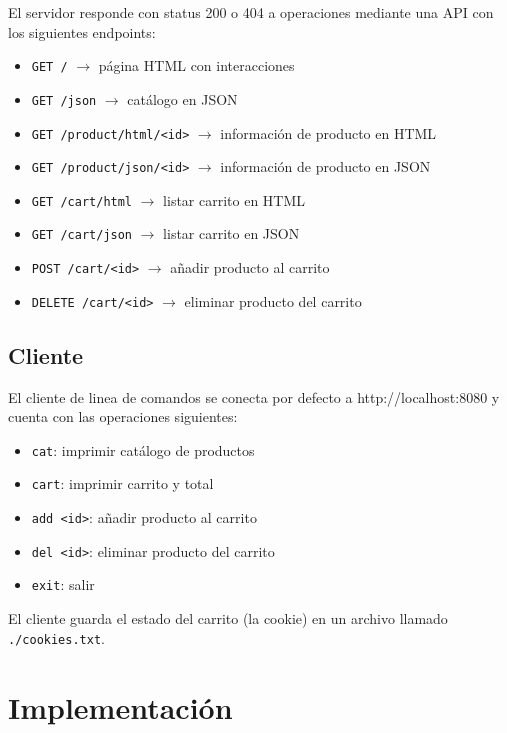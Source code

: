 \documentclass[12pt]{article}
\begin{document}
    El servidor responde con status 200 o 404 a operaciones mediante una API con los siguientes endpoints:
    \begin{itemize}
        \item \texttt{GET /} $\rightarrow$ página HTML con interacciones
        \item \texttt{GET /json} $\rightarrow$ catálogo en JSON
        \item \texttt{GET /product/html/\textless id\textgreater} $\rightarrow$ información de producto en HTML
        \item \texttt{GET /product/json/\textless id\textgreater} $\rightarrow$ información de producto en JSON
        \item \texttt{GET /cart/html} $\rightarrow$ listar carrito en HTML
        \item \texttt{GET /cart/json} $\rightarrow$ listar carrito en JSON
        \item \texttt{POST /cart/\textless id\textgreater} $\rightarrow$ añadir producto al carrito
        \item \texttt{DELETE /cart/\textless id\textgreater} $\rightarrow$ eliminar producto del carrito
    \end{itemize}

    \subsection{Cliente} \label{cmd}

    El cliente de linea de comandos se conecta por defecto a http://localhost:8080
    y cuenta con las operaciones siguientes:
    \begin{itemize}
        \item \texttt{cat}: imprimir catálogo de productos
        \item \texttt{cart}: imprimir carrito y total
        \item \texttt{add \textless id\textgreater}: añadir producto al carrito
        \item \texttt{del \textless id\textgreater}: eliminar producto del carrito
        \item \texttt{exit}: salir
    \end{itemize}

    El cliente guarda el estado del carrito (la cookie) en un archivo llamado
    \texttt{./cookies.txt}.

    \section{Implementación}
\end{document}
